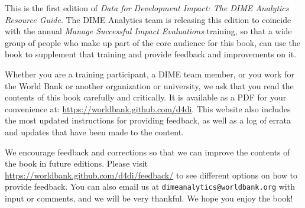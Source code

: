 This is the first edition of
\textit{Data for Development Impact:
The DIME Analytics Resource Guide}.
The DIME Analytics team is releasing this edition
to coincide with the annual \textit{Manage Successful Impact Evaluations} training,
so that a wide group of people who make up
part of the core audience for this book,
can use the book to supplement that training
and provide feedback and improvements on it.

Whether you are a training participant,
a DIME team member, or you work for the World Bank
or another organization or university,
we ask that you read the contents of this book carefully and critically.
It is available as a PDF for your convenience at:
\url{https://worldbank.github.com/d4di}.
This website also includes the most updated instructions
for providing feedback, as well as
a log of errata and updates that have been made to the content.

We encourage feedback and corrections
so that we can improve the contents of the book
in future editions. Please visit 
\url{https://worldbank.github.com/d4di/feedback/} to 
see different options on how to provide feedback.
You can also email us at \texttt{dimeanalytics@worldbank.org}
with input or comments, and we will be very thankful.
We hope you enjoy the book!
